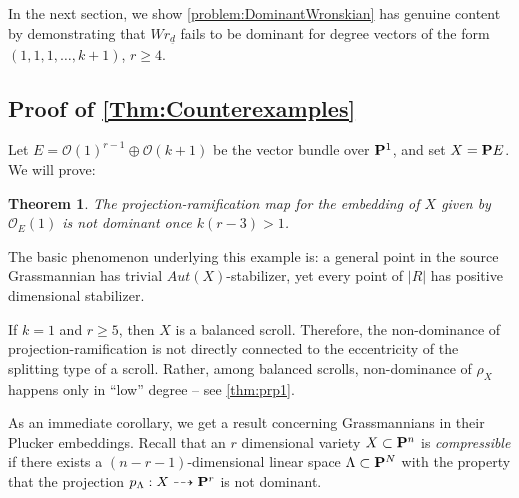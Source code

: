 \documentclass[11pt,reqno]{amsart}
\theoremstyle{plain}
\newtheorem{theorem}{Theorem}[section]
\theoremstyle{definition}
\theoremstyle{remark}
\numberwithin{equation}{section}
\numberwithin{equation}{section}
\renewcommand{\O}{\mathcal O}
\begin{document}
In the next section, we show \autoref{problem:DominantWronskian} has genuine content  by demonstrating that $Wr_{\underline{d}}$ fails to be dominant for degree vectors of the form $(1,1,1, \dots, k+1)$, $r \geq 4$.




\subsection{Proof of \autoref{Thm:Counterexamples}}

Let $E = \O(1)^{r-1} \oplus \O(k+1)$ be the vector bundle over
$\P^{1}$, and set $X = \P E$. We will prove:
\begin{theorem}
    The projection-ramification map for the embedding of $X$ given by $\O_{E}(1)$ is not
    dominant once $k(r-3) > 1$.
    \label{NonDominance}
\end{theorem}

\begin{remark}
The basic phenomenon underlying this example is: a general point in the source Grassmannian
has trivial $Aut(X)$-stabilizer, yet every point of $|R|$ has positive dimensional stabilizer. 
\end{remark}

\begin{remark}
If $k = 1$ and $r \geq 5$, then $X$ is a balanced
scroll. Therefore, the non-dominance of projection-ramification is not directly
connected to the eccentricity of the splitting type of a scroll. Rather,
among balanced scrolls, non-dominance of $\rho_{X}$ happens only in ``low''
degree -- see \autoref{thm:prp1}.
\end{remark}


As an immediate corollary, we  get a result concerning  Grassmannians in their Plucker
embeddings. Recall that an $r$ dimensional variety $X \subset \P^{n}$ is
{\sl compressible} if there exists a $(n-r-1)$-dimensional linear space
$\Lambda \subset \P^{N}$ with the property that the projection $p_{\Lambda}: X
\dashrightarrow \P^{r}$ is not dominant. 
\end{document}
